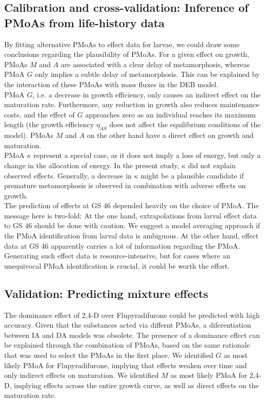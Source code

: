 \documentclass[utf8]{FrontiersinHarvard} %
\begin{document}
\subsection{Calibration and cross-validation: Inference of PMoAs from life-history data}
\noindent
By fitting alternative PMoAs to effect data for larvae, 
we could draw some conclusions regarding the plausibility of PMoAs. 
For a given effect on growth, 
PMoAs $M$ and $A$ are associated with a clear delay of metamorphosis, 
whereas PMoA $G$ only implies a subtle delay of metamorphosis. 
This can be explained by the interaction of these PMoAs with mass fluxes in the DEB model.\\
PMoA $G$, i.e. a decrease in growth efficiency, 
only causes an indirect effect on the maturation rate.
Furthermore, any reduction in growth also reduces maintenance costs, 
and the effect of $G$ approaches zero as an individual reaches its maximum length 
(the growth efficiency $\eta_{AS}$ does not affect the equilibrium conditions of the model).
PMoAs $M$ and $A$ on the other hand have a direct effect on growth and maturation.\\
PMoA $\kappa$ represent a special case, as it does not imply a loss of energy, 
but only a change in the allocation of energy. 
In the present study, $\kappa$ did not explain observed effects. 
Generally, a decrease in $\kappa$ might be a plausible candidate if premature metamorphosis is observed 
in combination with adverse effects on growth.\\
The prediction of effects at GS 46 depended heavily on the choice of PMoA. 
The message here is two-fold: 
At the one hand, extrapolations from larval effect data to GS 46 should be done with caution. 
We suggest a model averaging approach if the PMoA identification from larval data is ambiguous.
At the other hand, effect data at GS 46 apparently carries a lot of information regarding the PMoA. 
Generating such effect data is resource-intensive, but for cases where an unequivocal PMoA identification is crucial, 
it could be worth the effort. 
%
\subsection{Validation: Predicting mixture effects}
\noindent
The dominance effect of 2,4-D over Flupyradifurone could be predicted with high accuracy. 
Given that the substances acted via differnt PMoAs, a diferentiation between IA and DA models was obsolete. 
The presence of a dominance effect can be explained through the combination of PMoAs, 
based on the same rationale that was used to select the PMoAs in the first place. 
We identified $G$ as most likely PMoA for Flupyradifurone, 
implying that effects weaken over time and only indirect effects on maturation. 
We identified $M$ as most likely PMoA for 2,4-D, 
implying effects across the entire growth curve, as well as direct effects on the maturation rate. 
%
\end{document}
